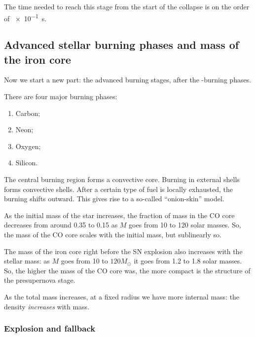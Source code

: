 \documentclass[main.tex]{subfiles}
\begin{document}
The time needed to reach this stage from the start of the collapse is on the order of \SI{e-1}{s}.

\subsection{Advanced stellar burning phases and mass of the iron core}

Now we start a new part: the advanced burning stages, after the -burning phases. 

There are four major burning phases: 
%
\begin{enumerate}
    \item Carbon;
    \item Neon;
    \item Oxygen;
    \item Silicon.
\end{enumerate}

The central burning region forms a convective core.
Burning in external shells forms convective shells.
After a certain type of fuel is locally exhausted, the burning shifts outward.
This gives rise to a so-called ``onion-skin'' model.

As the initial mass of the star increases, the fraction of mass in the CO core decreases from around \num{.35} to \num{.15} as \(M\) goes from 10 to 120 solar masses.  
So, the mass of the CO core scales with the initial mass, but sublinearly so.

The mass of the iron core right before the SN explosion also increases with the stellar mass: as \(M\) goes from 10 to \(120 M_{\odot}\) it goes from 1.2 to 1.8 solar masses. 
So, the higher the mass of the CO core was, the more compact is the structure of the presupernova stage.


As the total mass increases, at a fixed radius we have more internal mass: the density \emph{increases} with mass. 

\subsubsection{Explosion and fallback}
\end{document}
